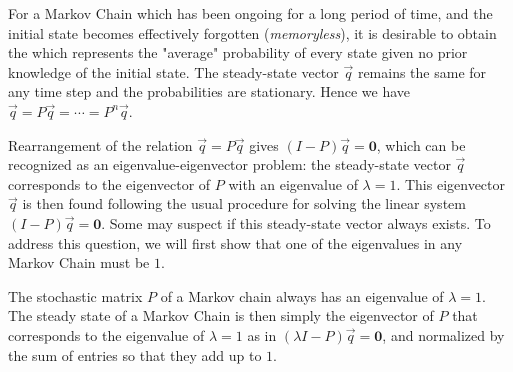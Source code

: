 For a Markov Chain which has been ongoing for a long period of time, and the initial state becomes effectively forgotten (\textit{memoryless}), it is desirable to obtain the  which represents the "average" probability of every state given no prior knowledge of the initial state. The steady-state vector $\vec{q}$ remains the same for any time step and the probabilities are stationary. Hence we have $\vec{q} = P\vec{q} = \cdots = P^n\vec{q}$. \par
Rearrangement of the relation $\vec{q} = P\vec{q}$ gives $(I-P)\vec{q} = \textbf{0}$, which can be recognized as an eigenvalue-eigenvector problem: the steady-state vector $\vec{q}$ corresponds to the eigenvector of $P$ with an eigenvalue of $\lambda = 1$. This eigenvector $\vec{q}$ is then found following the usual procedure for solving the linear system $(I-P)\vec{q} = \textbf{0}$. Some may suspect if this steady-state vector always exists. To address this question, we will first show that one of the eigenvalues in any Markov Chain must be $1$.
\begin{proper}
\label{proper:markoveigen1}
The stochastic matrix $P$ of a Markov chain always has an eigenvalue of $\lambda = 1$. The steady state of a Markov Chain is then simply the eigenvector of $P$ that corresponds to the eigenvalue of $\lambda = 1$ as in $(\lambda I-P)\vec{q} = \textbf{0}$, and normalized by the sum of entries so that they add up to $1$.
\end{proper}
